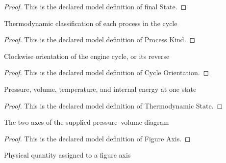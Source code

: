 \begin{proof}
  This is the declared model definition of final State.
\end{proof}
\begin{definition}
  \label{def:physics:phyx-mini-0432:phyxminiproblems-problemphyxmini0432-processkind}
  Thermodynamic classification of each process in the cycle
\end{definition}
\begin{proof}
  This is the declared model definition of Process Kind.
\end{proof}
\begin{definition}
  \label{def:physics:phyx-mini-0432:phyxminiproblems-problemphyxmini0432-cycleorientation}
  Clockwise orientation of the engine cycle, or its reverse
\end{definition}
\begin{proof}
  This is the declared model definition of Cycle Orientation.
\end{proof}
\begin{definition}
  \label{def:physics:phyx-mini-0432:phyxminiproblems-problemphyxmini0432-thermodynamicstate}
  Pressure, volume, temperature, and internal energy at one state
\end{definition}
\begin{proof}
  This is the declared model definition of Thermodynamic State.
\end{proof}
\begin{definition}
  \label{def:physics:phyx-mini-0432:phyxminiproblems-problemphyxmini0432-figureaxis}
  The two axes of the supplied pressure--volume diagram
\end{definition}
\begin{proof}
  This is the declared model definition of Figure Axis.
\end{proof}
\begin{definition}
  \label{def:physics:phyx-mini-0432:phyxminiproblems-problemphyxmini0432-axisquantity}
  Physical quantity assigned to a figure axis
\end{definition}

